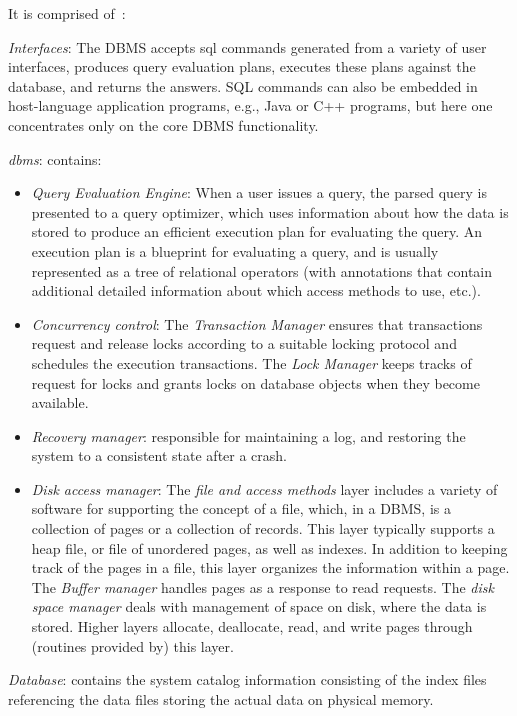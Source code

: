 It is comprised of~\cite{ramakrishnan2003database}: 
\begin{item-c}
\item \emph{Interfaces}:
  The DBMS accepts \gls{sql} commands generated from a
  variety of user interfaces, produces query evaluation plans, executes these
  plans against the database, and returns the answers. SQL commands can also be
  embedded in host-language application programs, e.g., Java or C++ programs,
  but here one concentrates only on the core DBMS functionality.
\item \emph{\gls{dbms}}: contains:
  \begin{itemize}
  \item \emph{Query Evaluation Engine}:
    When a user issues a query, the parsed query is presented to a query
    optimizer, which uses information about how the data is stored to produce an
    efficient execution plan for evaluating the query. An execution plan is a
    blueprint for evaluating a query, and is usually represented as a tree of
    relational operators (with annotations that contain additional detailed
    information about which access methods to use, etc.).
  \item \emph{Concurrency control}:
  The \emph{Transaction Manager} ensures that transactions request and release
  locks according to a suitable locking protocol and schedules the execution
  transactions.
%
  The \emph{Lock Manager} keeps tracks of request for locks and grants locks on
  database objects when they become available.
  \item \emph{Recovery manager}:
    responsible for maintaining a log, and restoring the system to a consistent
    state after a crash.
  \item \emph{Disk access manager}:
    The \emph{file and access methods} layer includes a variety of software for
    supporting the concept of a file, which, in a DBMS, is a collection of pages
    or a collection of records. This layer typically supports a heap file, or
    file of unordered pages, as well as indexes.
    In addition to keeping track of the pages in a file, this layer organizes
    the information within a page.
%
    The \emph{Buffer manager} handles pages as a response to read requests.
%   
    The \emph{disk space manager} deals with management of space on
    disk, where the data is stored. Higher layers allocate, deallocate, read,
    and write pages through (routines provided by) this layer.
  \end{itemize}
\item \emph{Database}: contains the system catalog information consisting of the
  index files referencing the data files storing the actual data on physical
  memory.
\end{item-c}

